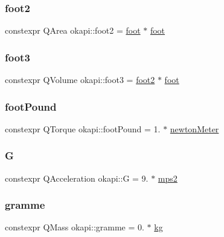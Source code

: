 \subsubsection{\texorpdfstring{foot2}{foot2}}
{\footnotesize\ttfamily constexpr Q\+Area okapi\+::foot2 = \mbox{\hyperlink{namespaceokapi_a76974d5bf7ed9473b2d59153894a8587}{foot}} $\ast$ \mbox{\hyperlink{namespaceokapi_a76974d5bf7ed9473b2d59153894a8587}{foot}}}

\mbox{\label{namespaceokapi_a287daabad9e16ca8503cbadba7dde50c}} 
\subsubsection{\texorpdfstring{foot3}{foot3}}
{\footnotesize\ttfamily constexpr Q\+Volume okapi\+::foot3 = \mbox{\hyperlink{namespaceokapi_a30332192fb24d5d1f81883969ec4878a}{foot2}} $\ast$ \mbox{\hyperlink{namespaceokapi_a76974d5bf7ed9473b2d59153894a8587}{foot}}}

\mbox{\label{namespaceokapi_a2312145f0a7f17b0a275289bfd369308}} 
\subsubsection{\texorpdfstring{footPound}{footPound}}
{\footnotesize\ttfamily constexpr Q\+Torque okapi\+::foot\+Pound = 1. $\ast$ \mbox{\hyperlink{namespaceokapi_a3d685da47b39ff4bdf1936c2e12076ee}{newton\+Meter}}}

\mbox{\label{namespaceokapi_a6e00ff72f863a56a3fc99ca94f106a5a}} 
\subsubsection{\texorpdfstring{G}{G}}
{\footnotesize\ttfamily constexpr Q\+Acceleration okapi\+::G = 9. $\ast$ \mbox{\hyperlink{namespaceokapi_a87ed91f18439f9e7e29392272f329f1c}{mps2}}}

\mbox{\label{namespaceokapi_a494f6de7e44c5a31663ff887d5dc73fb}} 
\subsubsection{\texorpdfstring{gramme}{gramme}}
{\footnotesize\ttfamily constexpr Q\+Mass okapi\+::gramme = 0. $\ast$ \mbox{\hyperlink{namespaceokapi_afcc67eb55c70e21f82cbee49aa19d05a}{kg}}}

